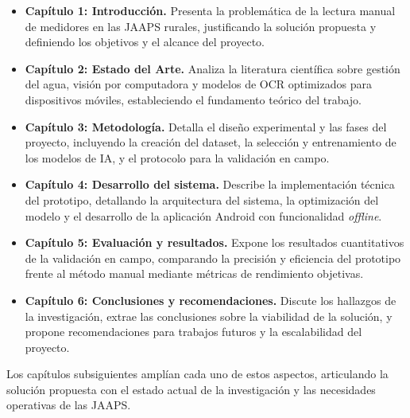 \begin{itemize}
    \item \textbf{Capítulo 1: Introducción.} Presenta la problemática de la lectura manual de medidores en las JAAPS rurales, justificando la solución propuesta y definiendo los objetivos y el alcance del proyecto.
    \item \textbf{Capítulo 2: Estado del Arte.} Analiza la literatura científica sobre gestión del agua, visión por computadora y modelos de OCR optimizados para dispositivos móviles, estableciendo el fundamento teórico del trabajo.
    \item \textbf{Capítulo 3: Metodología.} Detalla el diseño experimental y las fases del proyecto, incluyendo la creación del dataset, la selección y entrenamiento de los modelos de IA, y el protocolo para la validación en campo.
    \item \textbf{Capítulo 4: Desarrollo del sistema.} Describe la implementación técnica del prototipo, detallando la arquitectura del sistema, la optimización del modelo y el desarrollo de la aplicación Android con funcionalidad \textit{offline}.
    \item \textbf{Capítulo 5: Evaluación y resultados.} Expone los resultados cuantitativos de la validación en campo, comparando la precisión y eficiencia del prototipo frente al método manual mediante métricas de rendimiento objetivas.
    \item \textbf{Capítulo 6: Conclusiones y recomendaciones.} Discute los hallazgos de la investigación, extrae las conclusiones sobre la viabilidad de la solución, y propone recomendaciones para trabajos futuros y la escalabilidad del proyecto.
\end{itemize}

\noindent Los capítulos subsiguientes amplían cada uno de estos aspectos, articulando la solución propuesta con el estado actual de la investigación y las necesidades operativas de las JAAPS.
